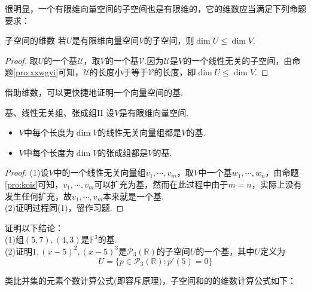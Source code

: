\documentclass[lang=cn, zihao=5]{elegantbook}
\newcommand{\R}{\mathbb{R}}
\newcommand{\F}{\mathbb{F}}
\begin{document}
很明显，一个有限维向量空间的子空间也是有限维的，它的维数应当满足下列命题要求：

\begin{proposition}{子空间的维数}
	若$U$是有限维向量空间$V$的子空间，则$\dim U \leq \dim V$.
\end{proposition}
\begin{proof}
	取$U$的一个基$\mathcal{U}$，取$V$的一个基$\mathcal{V}$.因为$\mathcal{U}$是$V$的一个线性无关的子空间，由命题\ref{pro:xxwgvi}可知，$\mathcal{U}$的长度小于等于$\mathcal{V}$的长度，即$\dim U \leq \dim V$.
\end{proof}

借助维数，可以更快捷地证明一个向量空间的基.

\begin{proposition}{基、线性无关组、张成组II}
	设$V$是有限维向量空间.
	\begin{itemize}
		\item $V$中每个长度为$\dim V$的线性无关向量组都是$V$的基.
		\item $V$中每个长度为$\dim V$的张成组都是$V$的基.
	\end{itemize}
\end{proposition}
\begin{proof}
	(1)设$V$中的一个线性无关向量组$v_1, \cdots ,v_m$，取$V$中一个基$w_1 , \cdots , w_n$，由命题\ref{pro:kois}可知，$v_1, \cdots ,v_m$可以扩充为基，然而在此过程中由于$m=n$，实际上没有发生任何扩充，故$v_1, \cdots ,v_m$本来就是一个基. \\
	(2)证明过程同(1)，留作习题.
\end{proof}

\begin{example}
	证明以下结论： \\
	(1)组$(5,7),(4,3)$是$\F ^{3}$的基. \\
	(2)证明$1,(x-5)^2,(x-5)^3$是$\mathcal{P}_{3} (\R)$的子空间$U$的一个基，其中$U$定义为$$U = \{ p \in \mathcal{P}_{3} (\R) : p'(5)=0 \}$$
\end{example}

类比并集的元素个数计算公式(即容斥原理)，子空间和的的维数计算公式如下：
\end{document}
